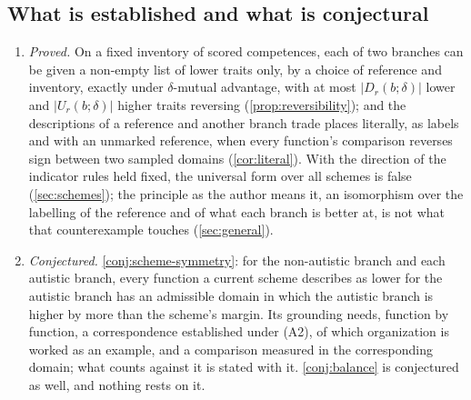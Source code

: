 \subsection{What is established and what is conjectural}
\label{sec:established}

\begin{enumerate}[label=(\roman*), leftmargin=*, nosep]
\item \emph{Proved.} On a fixed inventory of scored competences, each of two branches can be given a non-empty list of lower traits only, by a choice of reference and inventory, exactly under $\delta$-mutual advantage, with at most $|D_r(b;\delta)|$ lower and $|U_r(b;\delta)|$ higher traits reversing (\autoref{prop:reversibility}); and the descriptions of a reference and another branch trade places literally, as labels and with an unmarked reference, when every function's comparison reverses sign between two sampled domains (\autoref{cor:literal}). With the direction of the indicator rules held fixed, the universal form over all schemes is false (\autoref{sec:schemes}); the principle as the author means it, an isomorphism over the labelling of the reference and of what each branch is better at, is not what that counterexample touches (\autoref{sec:general}).
\item \emph{Conjectured.} \autoref{conj:scheme-symmetry}: for the non-autistic branch and each autistic branch, every function a current scheme describes as lower for the autistic branch has an admissible domain in which the autistic branch is higher by more than the scheme's margin. Its grounding needs, function by function, a correspondence established under (A2), of which organization is worked as an example, and a comparison measured in the corresponding domain; what counts against it is stated with it. \autoref{conj:balance} is conjectured as well, and nothing rests on it.

\end{enumerate}
